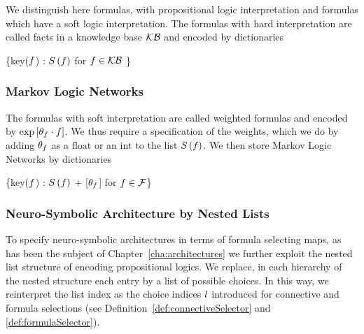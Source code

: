 We distinguish here formulas, with propositional logic interpretation and formulas which have a soft logic interpretation.
The formulas with hard interpretation are called facts in a knowledge base $\mathcal{KB}$ and encoded by dictionaries
\begin{centeredcode}
	\{key($f$) : $S\left(f\right)$ for $f\in\mathcal{KB}$ \}
\end{centeredcode}

\subsubsection{Markov Logic Networks}

The formulas with soft interpretation are called weighted formulas and encoded by $\mathrm{exp}\left[\theta_{f}\cdot f\right]$.
We thus require a specification of the weights, which we do by adding $\theta_{f}$ as a $\mathrm{float}$ or an $\mathrm{int}$ to the list $S\left(f\right)$.
We then store Markov Logic Networks by dictionaries
\begin{centeredcode}
	\{key($f$) : $S\left(f\right)$ + [$\theta_{f}$] for $f\in\mathcal{F}$\}
\end{centeredcode}

\subsubsection{Neuro-Symbolic Architecture by Nested Lists}

To specify neuro-symbolic architectures in terms of formula selecting maps, as has been the subject of Chapter~\ref{cha:architectures} we further exploit the nested list structure of encoding propositional logics.
We replace, in each hierarchy of the nested structure each entry by a list of possible choices.
In this way, we reinterpret the list index as the choice indices $l$ introduced for connective and formula selections (see Definition~\ref{def:connectiveSelector} and \ref{def:formulaSelector}).

